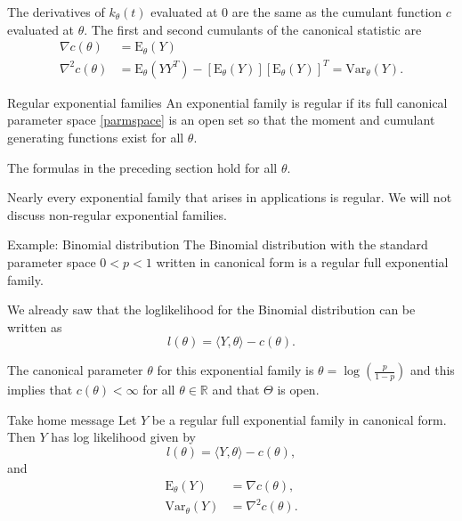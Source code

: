 \documentclass[
  ignorenonframetext,
]{beamer}
\begin{document}
\begin{frame}{}
\protect\hypertarget{section-2}{}
The derivatives of \(k_\theta(t)\) evaluated at 0 are the same as the
cumulant function \(c\) evaluated at \(\theta\). The first and second
cumulants of the canonical statistic are \begin{equation} \label{cumrel}
\begin{split}
    \nabla c(\theta) &= \text{E}_\theta(Y) \\
    \nabla^2 c(\theta) &= \text{E}_\theta(YY^T) - \left[\text{E}_\theta(Y)\right]\left[\text{E}_\theta(Y)\right]^T = \text{Var}_\theta(Y).  
\end{split}
\end{equation}
\end{frame}

\begin{frame}{Regular exponential families}
\protect\hypertarget{regular-exponential-families}{}
An exponential family is regular if its full canonical parameter space
\eqref{parmspace} is an open set so that the moment and cumulant
generating functions exist for all \(\theta\).

The formulas in the preceding section hold for all \(\theta\).

Nearly every exponential family that arises in applications is regular.
We will not discuss non-regular exponential families.
\end{frame}

\begin{frame}{Example: Binomial distribution}
\protect\hypertarget{example-binomial-distribution-2}{}
The Binomial distribution with the standard parameter space
\(0 < p < 1\) written in canonical form is a regular full exponential
family.

We already saw that the loglikelihood for the Binomial distribution can
be written as \[
  l(\theta) = \langle Y,\theta \rangle - c(\theta).
\]

The canonical parameter \(\theta\) for this exponential family is
\(\theta = \log\left(\frac{p}{1-p}\right)\) and this implies that
\(c(\theta) < \infty\) for all \(\theta \in \mathbb{R}\) and that
\(\Theta\) is open.
\end{frame}

\begin{frame}{Take home message}
\protect\hypertarget{take-home-message}{}
Let \(Y\) be a regular full exponential family in canonical form. Then
\(Y\) has log likelihood given by \[
  l(\theta) = \langle Y,\theta \rangle - c(\theta),
\] and \begin{align*} 
    \text{E}_\theta(Y) &= \nabla c(\theta),  \\
    \text{Var}_\theta(Y) &= \nabla^2 c(\theta).   
\end{align*}
\end{frame}
\end{document}
